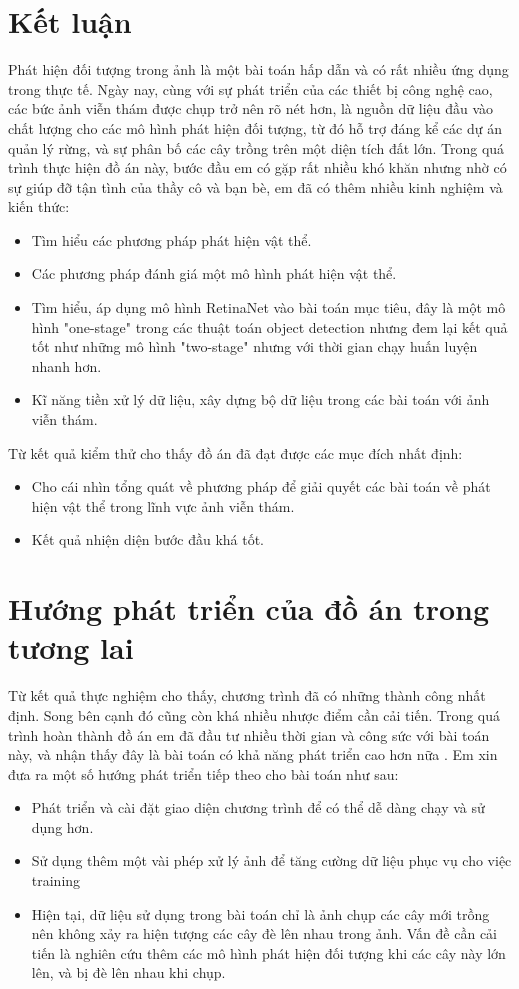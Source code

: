 \documentclass[a4paper, 12pt]{report}
\begin{document}
\section{Kết luận}
Phát hiện đối tượng trong ảnh là một bài toán hấp dẫn và có rất nhiều ứng dụng trong thực tế. Ngày nay, cùng với sự phát triển của các thiết bị công nghệ cao,  các bức ảnh viễn thám được chụp trở nên rõ nét hơn,  là nguồn dữ liệu đầu vào chất lượng cho các mô hình phát hiện đối tượng,  từ đó hỗ trợ đáng kể các dự án quản lý rừng,  và sự phân bố các cây trồng trên một diện tích đất lớn. Trong quá trình thực hiện đồ án này, bước đầu em có gặp rất nhiều khó khăn nhưng nhờ có sự giúp đỡ tận tình của thầy cô và bạn bè, em đã có thêm nhiều kinh nghiệm và kiến thức:
\begin{itemize}
	\item Tìm hiểu các phương pháp phát hiện vật thể.
	\item Các phương pháp đánh giá một mô hình phát hiện vật thể.
	\item Tìm hiểu, áp dụng mô hình RetinaNet vào bài toán mục tiêu, đây là một mô hình "one-stage"  trong các thuật toán object detection nhưng đem lại kết quả tốt như những mô hình "two-stage"  nhưng với thời gian chạy huấn luyện nhanh hơn.
	\item Kĩ năng tiền xử lý dữ liệu, xây dựng bộ dữ liệu trong các bài toán với ảnh viễn thám.
	
	
\end{itemize}
Từ kết quả kiểm thử cho thấy đồ án đã đạt được các mục đích nhất định:
\begin{itemize}
	\item Cho cái nhìn tổng quát về phương pháp để giải quyết các bài toán về phát hiện vật thể trong lĩnh vực ảnh viễn thám.
	\item Kết quả nhiện diện bước đầu khá tốt.
\end{itemize}
\section{Hướng phát triển của đồ án trong tương lai}
Từ kết quả thực nghiệm cho thấy, chương trình đã có những thành công nhất định. Song bên cạnh đó cũng còn khá nhiều nhược điểm cần cải tiến. Trong quá trình hoàn thành đồ án em đã đầu tư nhiều thời gian và công sức với bài toán này, và nhận thấy đây là bài toán có khả năng phát triển cao hơn nữa . Em xin đưa ra một số hướng phát triển tiếp theo cho bài toán như sau:
\begin{itemize}
	\item Phát triển và cài đặt giao diện chương trình để có thể dễ dàng chạy và sử dụng hơn. 
	\item Sử dụng thêm một vài phép xử lý ảnh để tăng cường dữ liệu phục vụ cho việc training 
	\item Hiện tại,  dữ liệu sử dụng trong bài toán chỉ là ảnh chụp các cây mới trồng nên không xảy ra hiện tượng các cây đè lên nhau trong ảnh.  Vấn đề cần cải tiến là  nghiên cứu thêm các mô hình phát hiện đối tượng khi các cây này lớn lên, và bị đè lên nhau khi chụp.
\end{itemize}
\end{document}
